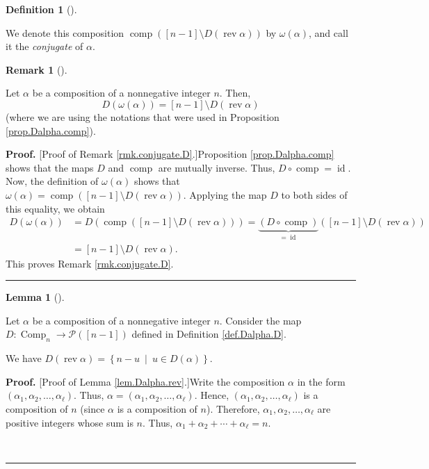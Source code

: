 \documentclass[numbers=enddot,12pt,final,onecolumn,notitlepage,abstracton]{scrartcl}
\theoremstyle{definition}
\newtheorem{lem}[theo]{Lemma}
\newenvironment{lemma}[1][]
{\begin{lem}[#1]\begin{leftbar}}
{\end{leftbar}\end{lem}}
\newtheorem{defi}[theo]{Definition}
\newenvironment{definition}[1][]
{\begin{defi}[#1]\begin{leftbar}}
{\end{leftbar}\end{defi}}
\newtheorem{remk}[theo]{Remark}
\newenvironment{remark}[1][]
{\begin{remk}[#1]\begin{leftbar}}
{\end{leftbar}\end{remk}}
\newenvironment{proof}[1][Proof]{\noindent\textbf{#1.} }{\ \rule{0.5em}{0.5em}}
\newenvironment{verlong}{}{}
\begin{document}
\begin{verlong}
\begin{footnotesize}
\begin{definition}
We denote this composition $\operatorname*{comp}\left(  \left[  n-1\right]
\setminus D\left(  \operatorname*{rev}\alpha\right)  \right)  $ by
$\omega\left(  \alpha\right)  $, and call it the \textit{conjugate} of
$\alpha$.
\end{definition}

\begin{remark}
\label{rmk.conjugate.D}Let $\alpha$ be a composition of a nonnegative integer
$n$. Then,%
\[
D\left(  \omega\left(  \alpha\right)  \right)  =\left[  n-1\right]  \setminus
D\left(  \operatorname*{rev}\alpha\right)
\]
(where we are using the notations that were used in Proposition
\ref{prop.Dalpha.comp}).
\end{remark}

\begin{proof}
[Proof of Remark \ref{rmk.conjugate.D}.]Proposition \ref{prop.Dalpha.comp}
shows that the maps $D$ and $\operatorname*{comp}$ are mutually inverse. Thus,
$D\circ\operatorname*{comp}=\operatorname*{id}$. Now, the definition of
$\omega\left(  \alpha\right)  $ shows that $\omega\left(  \alpha\right)
=\operatorname*{comp}\left(  \left[  n-1\right]  \setminus D\left(
\operatorname*{rev}\alpha\right)  \right)  $. Applying the map $D$ to both
sides of this equality, we obtain%
\begin{align*}
D\left(  \omega\left(  \alpha\right)  \right)   &  =D\left(
\operatorname*{comp}\left(  \left[  n-1\right]  \setminus D\left(
\operatorname*{rev}\alpha\right)  \right)  \right)  =\underbrace{\left(
D\circ\operatorname*{comp}\right)  }_{=\operatorname*{id}}\left(  \left[
n-1\right]  \setminus D\left(  \operatorname*{rev}\alpha\right)  \right) \\
&  =\left[  n-1\right]  \setminus D\left(  \operatorname*{rev}\alpha\right)  .
\end{align*}
This proves Remark \ref{rmk.conjugate.D}.
\end{proof}

\begin{lemma}
\label{lem.Dalpha.rev}Let $\alpha$ be a composition of a nonnegative integer
$n$. Consider the map $D:\operatorname*{Comp}\nolimits_{n}\rightarrow
\mathcal{P}\left(  \left[  n-1\right]  \right)  $ defined in Definition
\ref{def.Dalpha.D}.

We have $D\left(  \operatorname*{rev}\alpha\right)  =\left\{  n-u\ \mid\ u\in
D\left(  \alpha\right)  \right\}  $.
\end{lemma}

\begin{proof}
[Proof of Lemma \ref{lem.Dalpha.rev}.]Write the composition $\alpha$ in the
form $\left(  \alpha_{1},\alpha_{2},\ldots,\alpha_{\ell}\right)  $. Thus,
$\alpha=\left(  \alpha_{1},\alpha_{2},\ldots,\alpha_{\ell}\right)  $. Hence,
$\left(  \alpha_{1},\alpha_{2},\ldots,\alpha_{\ell}\right)  $ is a composition
of $n$ (since $\alpha$ is a composition of $n$). Therefore, $\alpha_{1}%
,\alpha_{2},\ldots,\alpha_{\ell}$ are positive integers whose sum is $n$.
Thus, $\alpha_{1}+\alpha_{2}+\cdots+\alpha_{\ell}=n$.


\end{proof}
\end{footnotesize}
\end{verlong}
\end{document}
